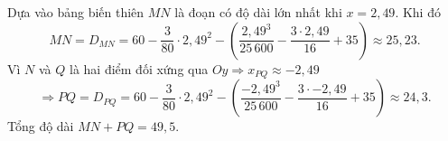 \begin{ex}
{\begin{center}
		\end{center}
		Dựa vào bảng biến thiên $M N$ là đoạn có độ dài lớn nhất khi $x=2{,}49$. Khi đó 
		$$M N=D_{M N}=60-\dfrac{3}{80} \cdot 2{,}49^2-\left(\dfrac{2{,}49^3}{25\,600}-\dfrac{3 \cdot 2{,}49}{16}+35\right) \approx 25{,}23.$$
		Vì $N$ và $Q$ là hai điểm đối xứng qua $O y \Rightarrow x_{P Q} \approx-2{,}49$
		$$
		\Rightarrow P Q=D_{P Q}=60-\dfrac{3}{80} \cdot 2{,}49^2-\left(\dfrac{-2{,}49^3}{25\,600}-\dfrac{3 \cdot-2{,}49}{16}+35\right) \approx 24{,}3.
		$$
		Tổng độ dài $M N+P Q=49{,}5$.}
\end{ex}

